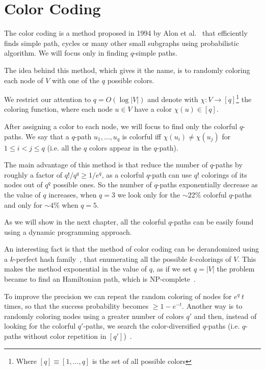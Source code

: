 \section{Color Coding}

The color coding is a method proposed in 1994 by Alon et al.~\cite{Alon:1995:COL:210332.210337} that efficiently finds simple path, cycles or many other small subgraphs using probabilistic algorithm. We will focus only in finding $q$-simple paths.\medskip

The idea behind this method, which gives it the name, is to randomly coloring each node of $V$ with one of the $q$ possible colors.

We restrict our attention to $q = O(\log |V|)$ and denote with $\chi : V \rightarrow [q]$\footnote{Where $[q] \equiv [1, \ldots, q]$ is the set of all possible colors} the coloring function, where each node $u \in V$ have a color $\chi(u) \in [q]$.\medskip

After assigning a color to each node, we will focus to find only the colorful $q$-paths. We say that a $q$-path $u_{1}, \ldots, u_{q}$ is colorful iff $\chi(u_{i}) \neq \chi(u_{j})$ for $1 \leq i < j \leq q$ (i.e. all the $q$ colors appear in the $q$-path).\medskip

The main advantage of this method is that reduce the number of $q$-paths by roughly a factor of $q! / q^{q} \geq 1/e^{q}$, as a colorful $q$-path can use $q!$ colorings of its nodes out of $q^{q}$ possible ones. So the number of $q$-paths exponentially decrease as the value of $q$ increases, when $q = 3$ we look only for the $\sim22\%$ colorful $q$-paths and only for $\sim4\%$ when $q = 5$.\bigskip

As we will show in the next chapter, all the colorful $q$-paths can be easily found using a dynamic programming approach.\medskip

An interesting fact is that the method of color coding can be derandomized using a $k$-perfect hash family~\cite{Alon:1995:COL:210332.210337}, that enumerating all the possible $k$-colorings of $V$.
This makes the method exponential in the value of $q$, as if we set $q = |V|$ the problem became to find an Hamiltonian path, which is NP-complete~\cite{GareyJohnson:1979}.\medskip

To improve the precision we can repeat the random coloring of nodes for $e^{q}\ t$ times, 
so that the success probability becomes $\geq 1-e^{-t}$. 
Another way is to randomly coloring nodes using a greater number of colors $q'$ and then, instead of looking for the colorful $q'$-paths,
we search the color-diversified $q$-paths (i.e. $q$-paths without color repetition in $[q']$)~\cite{deshpande2007randomized}.\medskip

